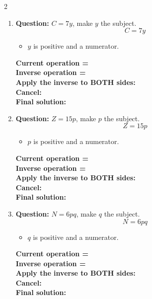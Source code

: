 \documentclass[11pt]{article}
\begin{document}
\begin{multicols}{2}
\begin{enumerate}[leftmargin=*, itemsep=10pt]
\columnbreak
\item \textbf{Question:} \( C = 7y \), make \( y \) the subject.
\[
C=7y
\]
\begin{itemize}[leftmargin=*, itemsep=2pt]
\item \(y\) is positive and a numerator.
\end{itemize}
\textbf{Current operation =} \\[1cm]
\textbf{Inverse operation =} \\[1cm]
\textbf{Apply the inverse to BOTH sides:} \\[1.5cm]
\textbf{Cancel:} \\[1.5cm]
\textbf{Final solution:}\\[1.5cm]

\item \textbf{Question:} \( Z = 15p \), make \( p \) the subject.
\[
Z=15p
\]
\begin{itemize}[leftmargin=*, itemsep=2pt]
\item \(p\) is positive and a numerator.
\end{itemize}
\textbf{Current operation =} \\[1cm]
\textbf{Inverse operation =} \\[1cm]
\textbf{Apply the inverse to BOTH sides:} \\[1.5cm]
\textbf{Cancel:} \\[1.5cm]
\textbf{Final solution:}\\[1.5cm]

\newpage
\item \textbf{Question:} \( N = 6pq \), make \( q \) the subject.
\[
N=6pq
\]
\begin{itemize}[leftmargin=*, itemsep=2pt]
\item \(q\) is positive and a numerator.
\end{itemize}
\textbf{Current operation =} \\[1cm]
\textbf{Inverse operation =} \\[1cm]
\textbf{Apply the inverse to BOTH sides:} \\[1.5cm]
\textbf{Cancel:} \\[1.5cm]
\textbf{Final solution:}\\[1.5cm]


\end{enumerate}
\end{multicols}
\end{document}
